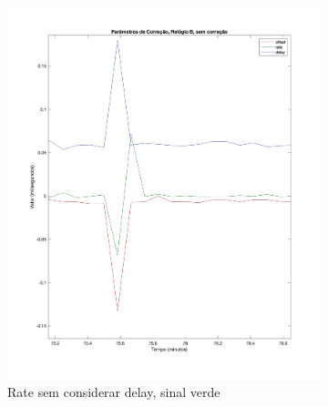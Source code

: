     \begin{figure}[h]
      \begin{subfigure}{0.49\linewidth}
        \centering
        \includegraphics[width=\linewidth]{figures/rate_vs_delay_caso1.png}
        \caption{Rate sem considerar delay, sinal verde}
        \label{fig:rate_vs_delay_caso1}
      \end{subfigure}
      \begin{subfigure}{0.49\linewidth}
        \centering

\end{subfigure}
\end{figure}
